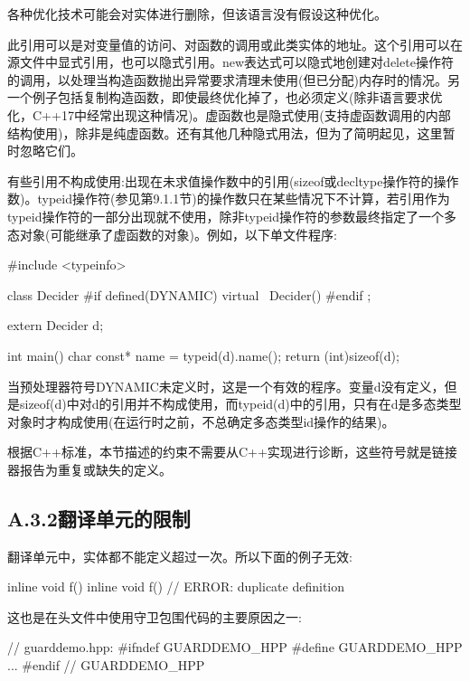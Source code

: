 \begin{notice}各种优化技术可能会对实体进行删除，但该语言没有假设这种优化。
\end{notice}

此引用可以是对变量值的访问、对函数的调用或此类实体的地址。这个引用可以在源文件中显式引用，也可以隐式引用。new表达式可以隐式地创建对delete操作符的调用，以处理当构造函数抛出异常要求清理未使用(但已分配)内存时的情况。另一个例子包括复制构造函数，即使最终优化掉了，也必须定义(除非语言要求优化，C++17中经常出现这种情况)。虚函数也是隐式使用(支持虚函数调用的内部结构使用)，除非是纯虚函数。还有其他几种隐式用法，但为了简明起见，这里暂时忽略它们。

有些引用不构成使用:出现在未求值操作数中的引用(sizeof或decltype操作符的操作数)。typeid操作符(参见第9.1.1节)的操作数只在某些情况下不计算，若引用作为typeid操作符的一部分出现就不使用，除非typeid操作符的参数最终指定了一个多态对象(可能继承了虚函数的对象)。例如，以下单文件程序:

\begin{cpp}
#include <typeinfo>

class Decider {
	#if defined(DYNAMIC)
	virtual ~Decider() {
	}
	#endif
};

extern Decider d;

int main()
{
	char const* name = typeid(d).name();
	return (int)sizeof(d);
}
\end{cpp}

当预处理器符号DYNAMIC未定义时，这是一个有效的程序。变量d没有定义，但是sizeof(d)中对d的引用并不构成使用，而typeid(d)中的引用，只有在d是多态类型对象时才构成使用(在运行时之前，不总确定多态类型id操作的结果)。

根据C++标准，本节描述的约束不需要从C++实现进行诊断，这些符号就是链接器报告为重复或缺失的定义。

\subsection{A.3.2\hspace{0.2cm}翻译单元的限制}

翻译单元中，实体都不能定义超过一次。所以下面的例子无效:

\begin{cpp}
inline void f() {}
inline void f() {} // ERROR: duplicate definition
\end{cpp}

这也是在头文件中使用守卫包围代码的主要原因之一:

\begin{cpp}
// guarddemo.hpp:
#ifndef GUARDDEMO_HPP
#define GUARDDEMO_HPP
...
#endif // GUARDDEMO_HPP
\end{cpp}

